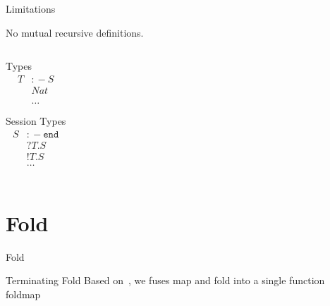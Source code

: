 \message{ !name(resumen.tex)}\documentclass{beamer}
\begin{document}

\begin{frame}


\end{frame}

\begin{frame}


\end{frame}

\begin{frame}{Limitations}
  
  No mutual recursive definitions.

  \hspace{5px}
  
 \begin{columns}[c] 
    Types \\
    \[\begin{array}{ll}
      T &{:\!\!-} S  \\
      & Nat \\
      & \\ 
      &  \dots \\
      &\\
    \end{array}\]
    Session Types \\
    \[\begin{array}{ll}
      S  &{:\!\!-} \mathtt{end}  \\
      & ?T.S    \\
      & !T.S    \\
      & \dots \\
    \end{array}\]
  \end{columns}

\end{frame}


\section{Fold}
\label{sec:fold}

\begin{frame}{Fold}
  {\small {}}  
\end{frame}

\begin{frame}{Terminating Fold }
  {\small {}}
  Based on~\cite{Norell2009}, we fuses \textsf{map} and \textsf{fold} into a single function foldmap
\end{frame}
\end{document}
